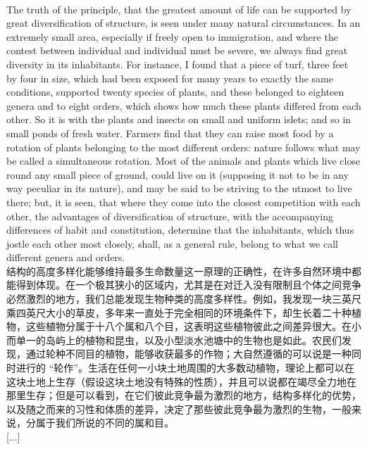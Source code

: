 \documentclass{article}
\begin{document}
\\
The truth of the principle, that the greatest amount of life can be supported by great diversification of structure, is seen under many natural circumstances. In an extremely small area, especially if freely open to immigration, and where the contest between individual and individual must be severe, we always find great diversity in its inhabitants. For instance, I found that a piece of turf, three feet by four in size, which had been exposed for many years to exactly the same conditions, supported twenty species of plants, and these belonged to eighteen genera and to eight orders, which shows how much these plants differed from each other. So it is with the plants and insects on small and uniform islets; and so in small ponds of fresh water. Farmers find that they can raise most food by a rotation of plants belonging to the most different orders: nature follows what may be called a simultaneous rotation. Most of the animals and plants which live close round any small piece of ground, could live on it (supposing it not to be in any way peculiar in its nature), and may be said to be striving to the utmost to live there; but, it is seen, that where they come into the closest competition with each other, the advantages of diversification of structure, with the accompanying differences of habit and constitution, determine that the inhabitants, which thus jostle each other most closely, shall, as a general rule, belong to what we call different genera and orders.\\
结构的高度多样化能够维持最多生命数量这一原理的正确性，在许多自然环境中都能得到体现。在一个极其狭小的区域内，尤其是在对迁入没有限制且个体之间竞争必然激烈的地方，我们总能发现生物种类的高度多样性。例如，我发现一块三英尺乘四英尺大小的草皮，多年来一直处于完全相同的环境条件下，却生长着二十种植物，这些植物分属于十八个属和八个目，这表明这些植物彼此之间差异很大。在小而单一的岛屿上的植物和昆虫，以及小型淡水池塘中的生物也是如此。农民们发现，通过轮种不同目的植物，能够收获最多的作物；大自然遵循的可以说是一种同时进行的 “轮作”。生活在任何一小块土地周围的大多数动植物，理论上都可以在这块土地上生存（假设这块土地没有特殊的性质），并且可以说都在竭尽全力地在那里生存；但是可以看到，在它们彼此竞争最为激烈的地方，结构多样化的优势，以及随之而来的习性和体质的差异，决定了那些彼此竞争最为激烈的生物，一般来说，分属于我们所说的不同的属和目。\\ 

[...]\\
\end{document}
